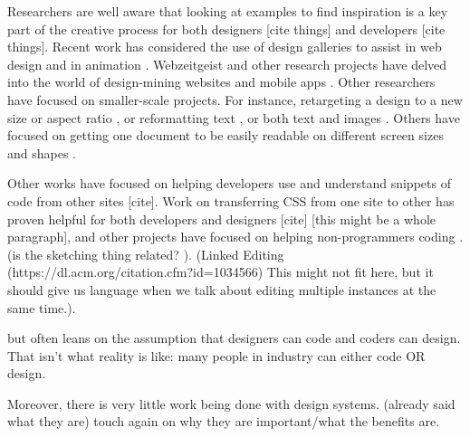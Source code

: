\documentclass{sigchi}
\begin{document}

Researchers are well aware that looking at examples to find inspiration is a key part of the creative process for both designers [cite things] and developers [cite things]. Recent work has considered the use of design galleries to assist in web design \cite{dtour_Ritchie_UIST_2011, interactive_example_galleries_Lee_CHI_2010} and in animation \cite{designGalleries_mitsubishi_Marks_SIGGRAPH_1997}. Webzeitgeist and other research projects have delved into the world of design-mining websites \cite{Webzeitgeist_Kumar_CHI_2013, learning_on_web_design_Satyanarayan_CHI_2012} and mobile apps \cite{mining_mobile_applications_alharbi_phdthesis_2016}. Other researchers have focused on smaller-scale projects. For instance, retargeting a design to a new size or aspect ratio \cite{learning_layouts_single_page_design_o_donovan_IEEE_2014}, or reformatting text \cite{review_automatic_docu_formatting_Hurst_DocEng_2009}, or both text and images \cite{probabilistic_auto_document_composition_Damera_Venkata_DocEng_2011}. Others have focused on getting one document to be easily readable on different screen sizes and shapes \cite{adaptiveGridBasedLayout_Jacobs_SIGGRAPH_2003}.

Other works have focused on helping developers use and understand snippets of code from other sites [cite]. Work on transferring CSS from one site to other has proven helpful for both developers and designers [cite] [this might be a whole paragraph], and other projects have focused on helping non-programmers coding  \cite{dinah_non_programmers_coding_Gross_CHI_2011}. (is the sketching thing related? \cite{retrieving_websites_with_sketches_example_based_design_hashimoto_igarashi_EUROGRAPHICS_EWSBIM_2005}). (Linked Editing (https://dl.acm.org/citation.cfm?id=1034566) This might not fit here, but it should give us language when we talk about editing multiple instances at the same time.).  

but often leans on the assumption that designers can code and coders can design. That isn’t what reality is like: many people in industry can either code OR design. 

Moreover, there is very little work being done with design systems. (already said what they are) touch again on why they are important/what the benefits are. 
\end{document}
